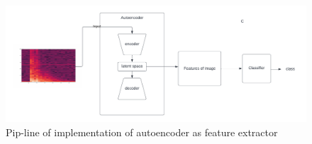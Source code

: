       \begin{figure}[h]
      	\centering
      	\includegraphics[width=1\linewidth]{images/ee.png}
      	\caption{Pip-line of implementation of autoencoder as feature extractor }
      	\label{ne11}
      \end{figure}
      


